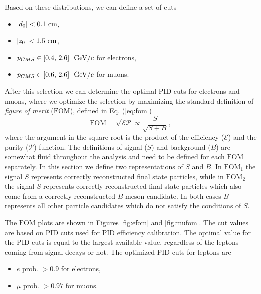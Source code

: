 Based on these distributions, we can define a set of cuts
\begin{itemize}
\item $\vert d_0 \vert < 0.1\mathrm{~cm}$,
\item $\vert z_0 \vert < 1.5\mathrm{~cm}$,
\item $p_{CMS} \in [0.4,\,2.6]~\mathrm{~GeV}/c$ for electrons,
\item $p_{CMS} \in [0.6,\,2.6]~\mathrm{~GeV}/c$ for muons.
\end{itemize}

After this selection we can determine the optimal PID cuts for electrons and muons, where we optimize the selection by maximizing the standard definition of \textit{figure of merit} ($\mathrm{FOM}$), defined in Eq. (\ref{eq:fom})
\begin{equation}
\label{eq:fom}
\mathrm{FOM} = \sqrt{\mathcal{E}\mathcal{P}} \propto \frac{S}{\sqrt{S+B}},
\end{equation} 
where the argument in the square root is the product of the efficiency ($\mathcal{E}$) and the purity ($\mathcal{P}$) function. The definitions of signal ($S$) and background ($B$) are somewhat fluid throughout the analysis and need to be defined for each $\mathrm{FOM}$ separately. In this section we define two representations of $S$ and $B$. In $\mathrm{FOM}_1$ the signal $S$ represents correctly reconstructed final state particles, while in $\mathrm{FOM}_2$ the signal $S$ represents correctly reconstructed final state particles which also come from a correctly reconstructed $B$ meson candidate. In both cases $B$ represents all other particle candidates which do not satisfy the conditions of $S$.

The $\mathrm{FOM}$ plots are shown in Figures \ref{fig:efom} and \ref{fig:mufom}. The cut values are based on PID cuts used for PID efficiency calibration. The optimal value for the PID cuts is equal to the largest available value, regardless of the leptons coming from signal decays or not. The optimized PID cuts for leptons are
\begin{itemize}
\item $e$ prob. $ > 0.9$ for electrons,
\item $\mu$ prob. $ > 0.97$ for muons.
\end{itemize}

